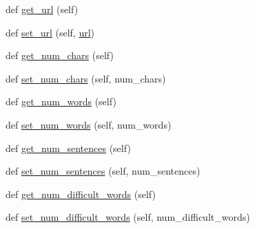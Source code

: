 \begin{DoxyCompactItemize}
\item 
def \hyperlink{class_bridges_1_1data__src__dependent_1_1book_1_1_book_a92215b347885c1430887dc529645305b}{get\+\_\+url} (self)
\item 
def \hyperlink{class_bridges_1_1data__src__dependent_1_1book_1_1_book_a0b2f30d4d491af88acac6781764b5d0b}{set\+\_\+url} (self, \hyperlink{class_bridges_1_1data__src__dependent_1_1book_1_1_book_a243366fff7196a0f06e9dc5f4bc17b0e}{url})
\item 
def \hyperlink{class_bridges_1_1data__src__dependent_1_1book_1_1_book_ae793a0884acf906d3811e38bb019090a}{get\+\_\+num\+\_\+chars} (self)
\item 
def \hyperlink{class_bridges_1_1data__src__dependent_1_1book_1_1_book_a4174e93d54c3e314a8c802197ec149b1}{set\+\_\+num\+\_\+chars} (self, num\+\_\+chars)
\item 
def \hyperlink{class_bridges_1_1data__src__dependent_1_1book_1_1_book_ad8b085adf24c12503bd6b07818f96ef0}{get\+\_\+num\+\_\+words} (self)
\item 
def \hyperlink{class_bridges_1_1data__src__dependent_1_1book_1_1_book_a2e2e01f688c8eec392f792cea3668e9b}{set\+\_\+num\+\_\+words} (self, num\+\_\+words)
\item 
def \hyperlink{class_bridges_1_1data__src__dependent_1_1book_1_1_book_afe2283fe3261ff339aa8b82829e88395}{get\+\_\+num\+\_\+sentences} (self)
\item 
def \hyperlink{class_bridges_1_1data__src__dependent_1_1book_1_1_book_acaabcb3944aaed5573b9c6f0d841a17a}{set\+\_\+num\+\_\+sentences} (self, num\+\_\+sentences)
\item 
def \hyperlink{class_bridges_1_1data__src__dependent_1_1book_1_1_book_a0e2ee8d00c954ef856316610636fb1d9}{get\+\_\+num\+\_\+difficult\+\_\+words} (self)
\item 
def \hyperlink{class_bridges_1_1data__src__dependent_1_1book_1_1_book_a15c216d9af1fe52638843cbbc6af7f21}{set\+\_\+num\+\_\+difficult\+\_\+words} (self, num\+\_\+difficult\+\_\+words)
\end{DoxyCompactItemize}
